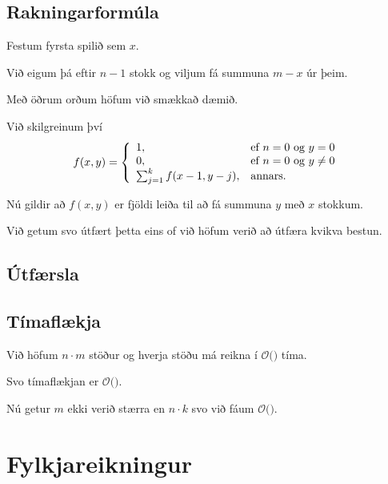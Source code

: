 \subsection{Rakningarformúla}
{
    {
    \item<1-> Festum fyrsta spilið sem $x$.
    \item<2-> Við eigum þá eftir $n - 1$ stokk og viljum fá summuna $m - x$ úr þeim.
    \item<3-> Með öðrum orðum höfum við smækkað dæmið.
    \item<4-> Við skilgreinum því
        \[
            f(x, y) = \left \{
                \env{array}
                { {l l}
                1, & \text{ef $n = 0$ og $y = 0$}\\
                0, & \text{ef $n = 0$ og $y \neq 0$}\\
                \sum_{j = 1}^k f(x - 1, y - j), & \text{annars}.
                }
                \right .
            \]
        \item<5-> Nú gildir að $f(x, y)$ er fjöldi leiða til að fá summuna $y$ með $x$ stokkum.
        \item<6-> Við getum svo útfært þetta eins of við höfum verið að útfæra kvikva bestun.
    }
}

\subsection{Útfærsla}
{
}

\subsection{Tímaflækja}
{
    {
        \item<1-> Við höfum $n \cdot m$ stöður og hverja stöðu má reikna í $\mathcal{O}($$)$ tíma.
        \item<3-> Svo tímaflækjan er $\mathcal{O}($$)$.
        \item<5-> Nú getur $m$ ekki verið stærra en $n \cdot k$ svo við fáum $\mathcal{O}($$)$.
    }
}


\section{Fylkjareikningur}
